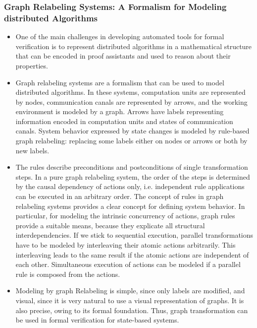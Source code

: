 \subsubsection{Graph Relabeling Systems: A Formalism for Modeling distributed Algorithms}
\begin{itemize}
    \item One of the main challenges in developing automated tools for formal verification is to represent distributed algorithms in a mathematical structure that can be encoded in proof assistants and used to reason about their properties.
    \item Graph relabeling systems are a formalism that can be used to model distributed algorithms. In these systems, computation units are represented by nodes, communication canals are represented by arrows, and the working environment is modeled by a graph. Arrows have labels representing information encoded in computation units and states of communication canals. System behavior expressed by state changes is modeled by rule-based graph relabeling: replacing some labels either on nodes or arrows or both by new labels. 
    \item The rules describe preconditions and postconditions of single transformation steps. In a pure graph relabeling system, the order of the steps is determined by the causal dependency of actions only, i.e. independent rule applications can be executed in an arbitrary order. The concept of rules in graph relabeling systems provides a clear concept for defining system behavior. In particular, for modeling the intrinsic concurrency of actions, graph rules provide a suitable means, because they explicate all structural interdependencies. If we stick to sequential execution, parallel transformations have to be modeled by interleaving their atomic actions arbitrarily. This interleaving leads to the same result if the atomic actions are independent of each other. Simultaneous execution of actions can be modeled if a parallel rule is composed from the actions.
    \item Modeling by graph Relabeling is simple, since only labels are modified, and visual, since it is very natural to use a visual representation of graphs. It is also precise, owing to its formal foundation. Thus, graph transformation can be used in formal verification for state-based systems.
\end{itemize}

